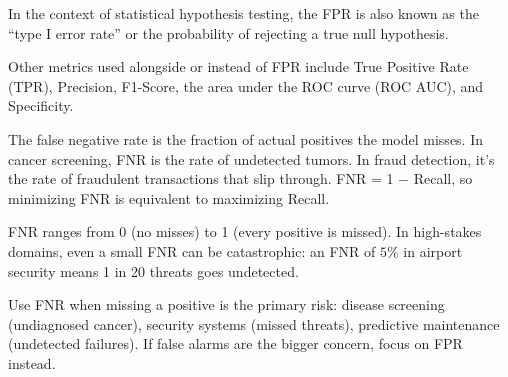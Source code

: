 

{
In the context of statistical hypothesis testing, the FPR is also known as the ``type I error rate'' or the probability of rejecting a true null hypothesis.
}

\metricsecondary

Other metrics used alongside or instead of FPR include True Positive Rate (TPR), Precision, F1-Score, the area under the ROC curve (ROC AUC), and Specificity.


\metricend
\clearpage
{}\label{sec:fnr}
\thispagestyle{classificationstyle}

The false negative rate is the fraction of actual positives the model misses. In cancer screening, FNR is the rate of undetected tumors.
In fraud detection, it's the rate of fraudulent transactions that slip through. FNR = 1 $-$ Recall, so minimizing FNR is equivalent
to maximizing Recall.
\begin{metricformula}
\end{metricformula}

FNR ranges from 0 (no misses) to 1 (every positive is missed). In high-stakes domains, even a small FNR can be
catastrophic: an FNR of $5\%$ in airport security means 1 in 20 threats goes undetected.


Use FNR when missing a positive is the primary risk: disease screening (undiagnosed cancer), security systems (missed
threats), predictive maintenance (undetected failures). If false alarms are the bigger concern, focus on FPR instead.

